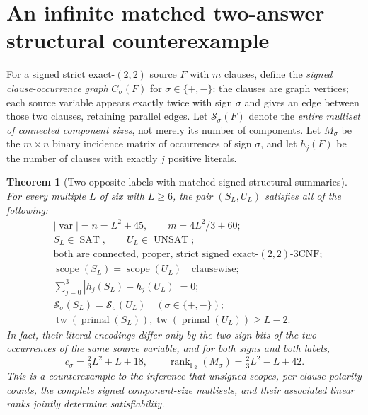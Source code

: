 \documentclass[10pt]{article}
\newtheorem{theorem}{Theorem}
\begin{document}
\section{An infinite matched two-answer structural counterexample}
For a signed strict exact-$(2,2)$ source $F$ with $m$ clauses, define the \emph{signed clause-occurrence graph} $C_\sigma(F)$ for $\sigma\in\{+,-\}$: the clauses are graph vertices; each source variable appears exactly twice with sign $\sigma$ and gives an edge between those two clauses, retaining parallel edges. Let $\mathcal S_\sigma(F)$ denote the \emph{entire multiset of connected component sizes}, not merely its number of components. Let $M_\sigma$ be the $m\times n$ binary incidence matrix of occurrences of sign $\sigma$, and let $h_j(F)$ be the number of clauses with exactly $j$ positive literals.
\begin{theorem}[Two opposite labels with matched signed structural summaries]\label{thm:matched}
For every multiple $L$ of six with $L\ge6$, the pair $(S_L,U_L)$ satisfies all of the following:
\[
\begin{aligned}
&|\operatorname{var}|=n=L^2+45,\qquad m=4L^2/3+60;\\
& S_L\in\operatorname{SAT},\qquad U_L\in\operatorname{UNSAT};\\
&\text{both are connected, proper, strict signed exact-$(2,2)$-3CNF};\\
&\operatorname{scope}(S_L)=\operatorname{scope}(U_L)\quad\text{clausewise};\\
&\sum_{j=0}^3|h_j(S_L)-h_j(U_L)|=0;\\
&\mathcal S_\sigma(S_L)=\mathcal S_\sigma(U_L)\quad(\sigma\in\{+,-\});\\
&\operatorname{tw}(\operatorname{primal}(S_L)),\operatorname{tw}(\operatorname{primal}(U_L))\ge L-2.
\end{aligned}
\]
In fact, their literal encodings differ only by the \emph{two sign bits} of the two occurrences of the same source variable, and for both signs and both labels,
\[
 c_\sigma=\tfrac23L^2+L+18,\qquad
 \operatorname{rank}_{\mathbb F_2}(M_\sigma)=\tfrac23L^2-L+42.
\]
This is a counterexample to the inference that unsigned scopes, per-clause polarity counts, the complete signed component-size multisets, and their associated linear ranks jointly determine satisfiability.
\end{theorem}
\end{document}
